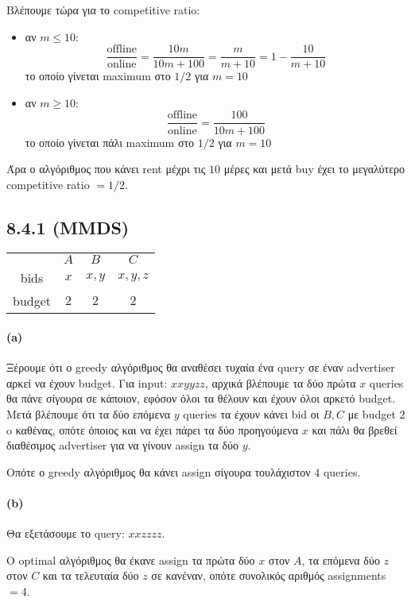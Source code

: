 \documentclass[a4paper,11pt]{article}
\begin{document}
Βλέπουμε τώρα για το competitive ratio:
\begin{itemize}
	\item αν $m \leq 10$:
		\[
			\frac{\text{offline}}{\text{online}} = \frac{10m}{10m+100} = \frac{m}{m+10} = 1 - \frac{10}{m+10}
		\]
		το οποίο γίνεται maximum στο $1/2$ για $m=10$
	\item αν $m \geq 10$:
		\[
			\frac{\text{offline}}{\text{online}} = \frac{100}{10m+100}
		\]
		το οποίο γίνεται πάλι maximum στο $1/2$ για $m=10$
\end{itemize}
Άρα ο αλγόριθμος που κάνει rent μέχρι τις $10$ μέρες και μετά buy έχει το μεγαλύτερο competitive ratio $=1/2$.

\subsection*{8.4.1 (MMDS)}

\begin{center}
	\begin{tabular}{| c || c | c | c |}
		\hline
		& $A$ & $B$ & $C$ \\ \hhline{|=#=|=|=|}
		bids & $x$ & $x,y$ & $x,y,z$ \\ \hline
		budget & $2$ & $2$ & $2$ \\ \hline
	\end{tabular}
\end{center}

\paragraph{(a)} Ξέρουμε ότι ο greedy αλγόριθμος θα αναθέσει τυχαία ένα query σε έναν advertiser αρκεί να έχουν budget.
Για input: $xxyyzz$, αρχικά βλέπουμε τα δύο πρώτα $x$ queries θα πάνε σίγουρα σε κάποιον, εφόσον όλοι τα θέλουν και έχουν όλοι αρκετό budget.
Μετά βλέπουμε ότι τα δύο επόμενα $y$ queries τα έχουν κάνει bid οι $B,C$ με budget $2$ o καθένας, οπότε όποιος και να έχει πάρει τα δύο προηγούμενα $x$ και πάλι θα βρεθεί διαθέσιμος advertiser για να γίνουν assign τα δύο $y$.

Οπότε ο greedy αλγόριθμος θα κάνει assign σίγουρα τουλάχιστον $4$ queries.

\paragraph{(b)} Θα εξετάσουμε το query: $xxzzzz$.

Ο optimal αλγόριθμος θα έκανε assign τα πρώτα δύο $x$ στον $A$, τα επόμενα δύο $z$ στον $C$ και τα τελευταία δύο $z$ σε κανέναν, οπότε συνολικός αριθμός assignments $=4$.
\end{document}
